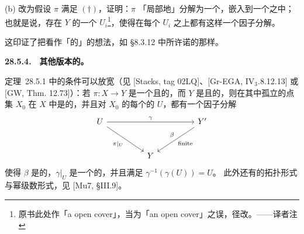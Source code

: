 (b) 改为假设 $\pi$ 满足 $(\dagger)$，证明：$\pi$ 「局部地」分解为一个\trOpenEmbedding{}，嵌入到一个\trFinite\trMorphism{}之中；也就是说，存在 $Y$ 的一个\trOpenCover{} $U_i$\footnote{原书此处作「a open cover」，当为「an open cover」之误，径改。——译者注}，使得在每个 $U_i$ 之上都有这样一个因子分解。

这印证了把\trQuasifinite\trMorphism{}看作「\trFinite\trMorphism{}的\trOpenSubset」的想法，如 \S8.3.12 中所许诺的那样。

\textbf{28.5.4.}\ \extrahard\ \textbf{其他版本的\trZariskiMainTheorem。}

\mbox{定理~28.5.1} 中的\trNoether{}条件可以放宽（见 [Stacks, tag 02LQ]、[Gr-EGA, IV$_3$.8.12.13] 或 [GW, Thm. 12.73]）：若 $\pi\colon X\to Y$ 是一个\trSeparated{}且\trFiniteType{}的\trMorphism，而 $Y$ 是\trQuasicompact{}且\trQuasiSeparated{}的，则在其\trFiber{}中孤立的点集 $X_0$ 在 $X$ 中是\trOpen{}的，并且对 $X_0$ 的每个\trQuasicompact{}的\trOpenSubset{} $U$，都有一个因子分解
\[
\begin{tikzcd}[row sep=2.8em, column sep=4.5em]
U \ar[rr, "\gamma"] \ar[dr, "\pi|_U"'] && Y' \ar[dl, "\beta"', "\text{finite}"] \\
& Y &
\end{tikzcd}
\]
使得 $\beta$ 是\trFinite{}的，$\gamma|_U$ 是一个\trQuasicompact{}的\trOpenEmbedding，并且满足 $\gamma^{-1}(\gamma(U))=U$。
此外还有\trZariskiMainTheorem{}的拓扑形式与幂级数形式，见 [Mu7, \S III.9]。
